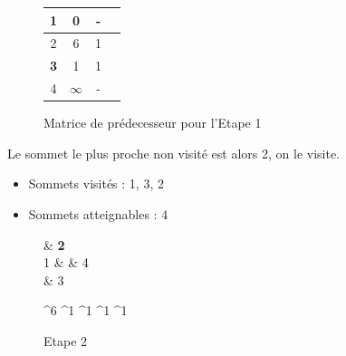 \documentclass[a4paper,12pt,final] {article}
\begin{document}
\begin{figure}[htpd]
\begin{center}
\begin{tabular}{|c|c|c|c|}
\hline
 1 & 0 & - \\
\hline
2 & 6 & 1 \\
\hline
{\color{red} \bf 3} & 1 & 1 \\
\hline
4 & $\infty$ & - \\
\hline
\end{tabular}
\end{center}
\caption{Matrice de prédecesseur pour l'Etape 1}
\end{figure}
Le sommet le plus proche non visité est alors 2, on le visite.
\begin{itemize}
\item Sommets visités : 1, 3, 2
\item Sommets atteignables : 4
\end{itemize}
\begin{figure}[htpd]
 \centering
 \begin{psmatrix}[mnode=circle]
	    & {\color{red} \bf 2}\\
	1 &    & 4\\
	    &  3\\
\end{psmatrix}
	
	^{6}
	^{1}
	^{1}
	^{1}
	^{1}

  \caption{Etape 2}
\end{figure}
\end{document}

